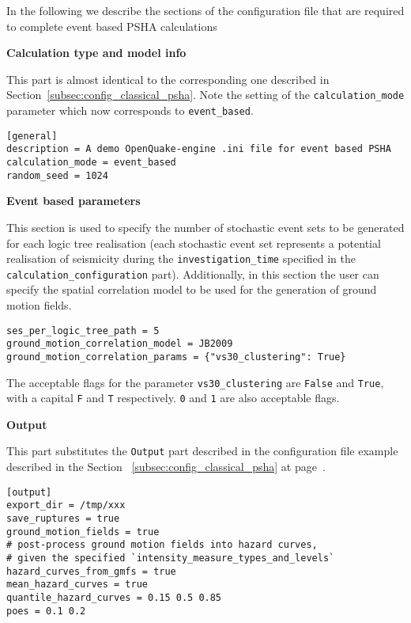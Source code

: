 In the following we describe the sections of the configuration file that are
required to complete event based PSHA calculations


\textbf{Calculation type and model info}

This part is almost identical to the corresponding one described in
Section~\ref{subsec:config_classical_psha}. Note the setting of the
\texttt{calculation\_mode} parameter which now corresponds to
\texttt{event\_based}.

\begin{verbatim}
[general]
description = A demo OpenQuake-engine .ini file for event based PSHA
calculation_mode = event_based
random_seed = 1024
\end{verbatim}

\textbf{Event based parameters}

This section is used to specify the number of stochastic event sets to be
generated for each logic tree realisation (each stochastic event set
represents a potential realisation of seismicity during the
\texttt{investigation\_time} specified in the
\texttt{calculation\_configuration} part). Additionally, in this section the
user can specify the spatial correlation model to be used for the generation
of ground motion fields.

\begin{verbatim}
ses_per_logic_tree_path = 5
ground_motion_correlation_model = JB2009
ground_motion_correlation_params = {"vs30_clustering": True}
\end{verbatim}

The acceptable flags for the parameter \verb+vs30_clustering+ are \verb+False+
and \verb+True+, with a capital \verb+F+ and \verb+T+ respectively. \verb+0+
and \verb+1+ are also acceptable flags.

\textbf{Output}

This part substitutes the \texttt{Output} part described in  the configuration
file example described in the Section~ \ref{subsec:config_classical_psha} at
page~\pageref{subsec:config_classical_psha}.

\begin{verbatim}
[output]
export_dir = /tmp/xxx
save_ruptures = true
ground_motion_fields = true
# post-process ground motion fields into hazard curves,
# given the specified `intensity_measure_types_and_levels`
hazard_curves_from_gmfs = true
mean_hazard_curves = true
quantile_hazard_curves = 0.15 0.5 0.85
poes = 0.1 0.2
\end{verbatim}

